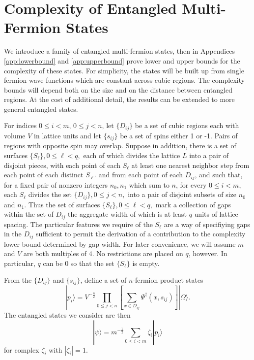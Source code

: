\documentclass[12pt,amsmath,amssymb,onecolumn]{revtex4-2}
\begin{document}
\section{\label{sec:entangledstates} Complexity of Entangled Multi-Fermion States}

We introduce a family of entangled multi-fermion states, then in 
Appendices \ref{app:lowerbound} and \ref{app:upperbound}
prove lower and upper bounds for the complexity of these states.
For simplicity, the states will be built up from single fermion wave functions which
are constant across cubic regions. The complexity bounds
will depend both on the size and on the distance
between entangled regions.
At the cost of additional detail, the results can
be extended to more general entangled states.

For indices $0 \leq i < m $, $0 \leq j < n$, let $\{ D_{ij} \}$ be a set of 
cubic regions each with
volume $V$ in lattice units
and let $\{s_{ij}\}$ be a set of spins either 1 or -1. 
Pairs of regions with opposite spin may overlap.
Suppose in addition,
there is a set
of surfaces $\{S_\ell\}, 0 \le \ell < q,$ each of which divides the lattice
$L$ into a pair of disjoint pieces, with each point of each
$S_\ell$ at least one nearest neighbor step from
each point of each distinct $S_{\ell'}$ and from
each point of each $D_{ij}$, and such that,
for a fixed pair of nonzero integers $n_0, n_1$ which sum to $n$,
for every
$0 \le i < m$,
each $S_\ell$ divides the set
$\{D_{ij}\}, 0 \le j < n,$ into a pair of disjoint subsets of size $n_0$ and $n_1$.
Thus the set of surfaces
$\{S_\ell\}, 0 \le \ell < q,$ mark a collection
of gaps within the set of $D_{ij}$ the aggregate
width of which is at least $q$ units of lattice spacing.
The particular features we require
of the $S_\ell$ are a way of
specifiying gaps in the $D_{ij}$ sufficient
to permit the derivation of a contribution to the complexity
lower bound determined by gap width.
For later convenience, we will assume $m$ and $V$
are both multiples of 4. No restrictions
are placed on $q$, however. In particular, $q$ can be 0 so that the set
$\{S_\ell\}$ is empty.

From the $\{ D_{ij} \}$ and $\{s_{ij}\}$, define a set of $n$-fermion product states
\begin{equation}
\label{pstates}
|p_i \rangle  =  
V^{-\frac{n}{2}}\prod_{0 \leq j < n} \left[\sum_{x \in D_{ij}} \Psi^{\dagger}( x, s_{ij})\right] |\Omega \rangle .
\end{equation}
The entangled states we consider are then
\begin{equation}
  \label{entangledstate}
|\psi \rangle  = m^{-\frac{1}{2}}\sum_{0 \le i < m} \zeta_i |p_i \rangle 
\end{equation}
for complex $\zeta_i$ with $| \zeta_i| = 1$.
\end{document}
